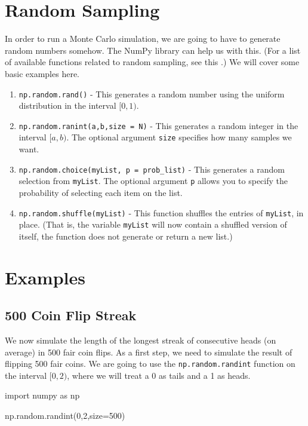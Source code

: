 \documentclass{ximera}
\begin{document}
\section{Random Sampling}

In order to run a Monte Carlo simulation, we are going to have to generate random numbers somehow. The NumPy library can help us with this. (For a list of available functions related to random sampling, see this .) We will cover some basic examples here.
\begin{enumerate}
	\item \verb|np.random.rand()| - This generates a random number using the uniform distribution in the interval $[0,1)$.
	\item \verb|np.random.ranint(a,b,size = N)| - This generates a random integer in the interval $[a,b)$. The optional argument \verb|size| specifies how many samples we want.
	\item \verb|np.random.choice(myList, p = prob_list)| - This generates a random selection from \verb|myList|. The optional argument \verb|p| allows you to specify the probability of selecting each item on the list.
	\item \verb|np.random.shuffle(myList)| - This function shuffles the entries of \verb|myList|, in place. (That is, the variable \verb|myList| will now contain a shuffled version of itself, the function does not generate or return a new list.)
\end{enumerate}

\section{Examples}

\subsection{500 Coin Flip Streak}

We now simulate the length of the longest streak of consecutive heads (on average) in 500 fair coin flips. As a first step, we need to simulate the result of flipping 500 fair coins. We are going to use the \verb|np.random.randint| function on the interval $[0,2)$, where we will treat a 0 as tails and a 1 as heads.

\begin{sageCell}
import numpy as np

np.random.randint(0,2,size=500)
\end{sageCell}
\end{document}
